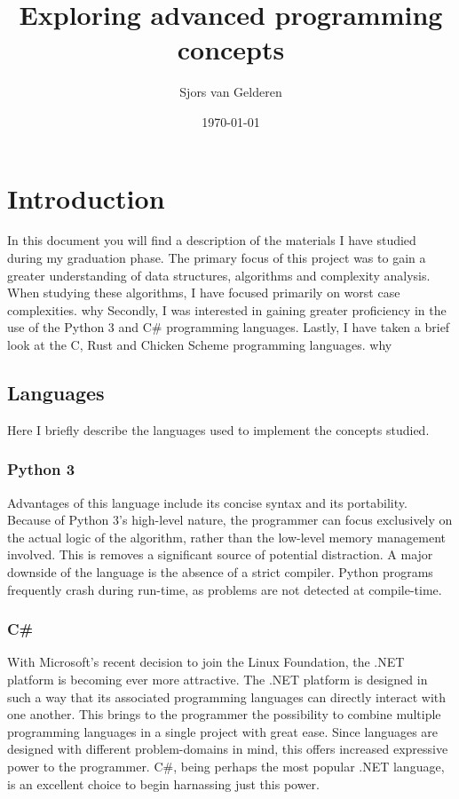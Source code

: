 \documentclass{article}
\author{Sjors van Gelderen}
\title{Exploring advanced programming concepts}
\date{\today{}}
\begin{document}
\maketitle{}

\newpage

\tableofcontents{}

\newpage

\section{Introduction}
In this document you will find a description of the materials I have studied during my graduation phase.
The primary focus of this project was to gain a greater understanding of data structures, algorithms and complexity analysis.
When studying these algorithms, I have focused primarily on worst case complexities. \huge why
Secondly, I was interested in gaining greater proficiency in the use of the Python 3 and C\# programming languages.
Lastly, I have taken a brief look at the C, Rust and Chicken Scheme programming languages. \huge why

\subsection{Languages}
Here I briefly describe the languages used to implement the concepts studied.

\subsubsection{Python 3}
Advantages of this language include its concise syntax and its portability.
Because of Python 3's high-level nature, the programmer can focus exclusively on the actual logic of the algorithm,
rather than the low-level memory management involved. This is removes a significant source of potential distraction.
A major downside of the language is the absence of a strict compiler.
Python programs frequently crash during run-time, as problems are not detected at compile-time.

\subsubsection{C\#}
With Microsoft's recent decision to join the Linux Foundation, the .NET platform is becoming ever more attractive.
The .NET platform is designed in such a way that its associated programming languages can directly interact with one another.
This brings to the programmer the possibility to combine multiple programming languages in a single project with great ease.
Since languages are designed with different problem-domains in mind, this offers increased expressive power to the programmer.
C\#, being perhaps the most popular .NET language, is an excellent choice to begin harnassing just this power.
\end{document}
